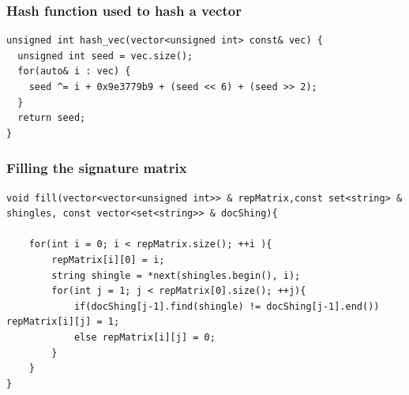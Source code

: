 \documentclass[12pt]{article}
\begin{document}
\subsubsection{Hash function used to hash a vector}
 \begin{lstlisting}
unsigned int hash_vec(vector<unsigned int> const& vec) {
  unsigned int seed = vec.size();
  for(auto& i : vec) {
    seed ^= i + 0x9e3779b9 + (seed << 6) + (seed >> 2);
  }
  return seed;
}

\end{lstlisting}
 \medskip 
  
\subsubsection{Filling the signature matrix}
\begin{lstlisting}
void fill(vector<vector<unsigned int>> & repMatrix,const set<string> & shingles, const vector<set<string>> & docShing){

    for(int i = 0; i < repMatrix.size(); ++i ){
        repMatrix[i][0] = i;
        string shingle = *next(shingles.begin(), i);
        for(int j = 1; j < repMatrix[0].size(); ++j){
            if(docShing[j-1].find(shingle) != docShing[j-1].end()) repMatrix[i][j] = 1;
            else repMatrix[i][j] = 0;
        }
    }
}
\end{lstlisting}
\medskip
\end{document}
